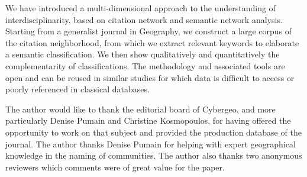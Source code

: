 We have introduced a multi-dimensional approach to the understanding of interdisciplinarity, based on citation network and semantic network analysis. Starting from a generalist journal in Geography, we construct a large corpus of the citation neighborhood, from which we extract relevant keywords to elaborate a semantic classification. We then show qualitatively and quantitatively the complementarity of classifications. The methodology and associated tools are open and can be reused in similar studies for which data is difficult to access or poorly referenced in classical databases.





\begin{acknowledgements}
The author would like to thank the editorial board of Cybergeo, and more particularly Denise Pumain and Christine Kosmopoulos, for having offered the opportunity to work on that subject and provided the production database of the journal. The author thanks Denise Pumain for helping with expert geographical knowledge in the naming of communities. The author also thanks two anonymous reviewers which comments were of great value for the paper.
\end{acknowledgements}






















